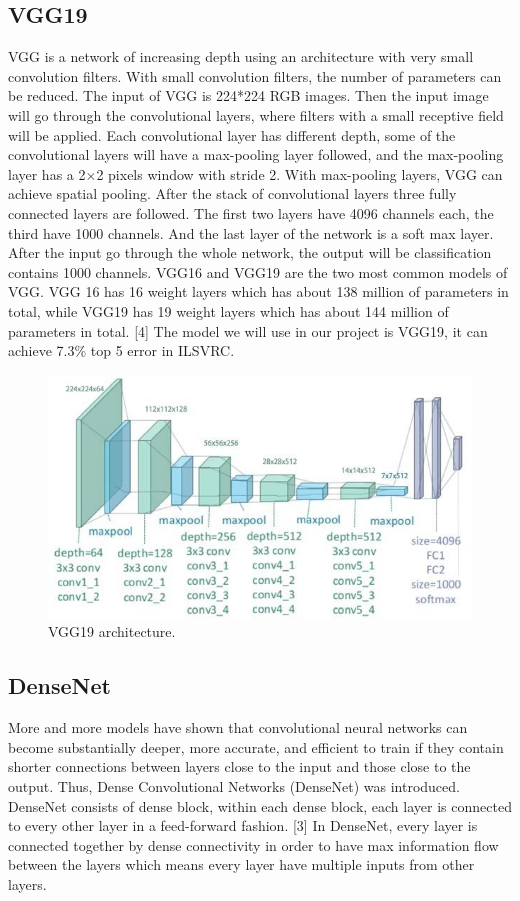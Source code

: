 \documentclass{article}
\begin{document}
\subsection{VGG19}
VGG is a network of increasing depth using an architecture with very small convolution filters. With small convolution filters, the number of parameters can be reduced. The input of VGG is 224*224 RGB images. Then the input image will go through the convolutional layers, where filters with a small receptive field will be applied. Each convolutional layer has different depth, some of the convolutional layers will have a max-pooling layer followed, and the max-pooling layer has a 2$\times$2 pixels window with stride 2. With max-pooling layers, VGG can achieve spatial pooling. After the stack of convolutional layers three fully connected layers are followed. The first two layers have 4096 channels each, the third have 1000 channels. And the last layer of the network is a soft max layer. After the input go through the whole network, the output will be classification contains 1000 channels. VGG16 and VGG19 are the two most common models of VGG. VGG 16 has 16 weight layers which has about 138 million of parameters in total, while VGG19 has 19 weight layers which has about 144 million of parameters in total. [4] The model we will use in our project is VGG19, it can achieve 7.3\% top 5 error in ILSVRC.

\begin{figure}[H]
	\centering
	\includegraphics[width=0.8\linewidth]{pics/vgg} 
	\caption{VGG19 architecture.}
\end{figure}

\subsection{DenseNet}

More and more models have shown that convolutional neural networks can become substantially deeper, more accurate, and efficient to train if they contain shorter connections between layers close to the input and those close to the output. Thus, Dense Convolutional Networks (DenseNet) was introduced. DenseNet consists of dense block, within each dense block, each layer is connected to every other layer in a feed-forward fashion. [3] In DenseNet, every layer is connected together by dense connectivity in order to have max information flow between the layers which means every layer have multiple inputs from other layers. 
\end{document}
